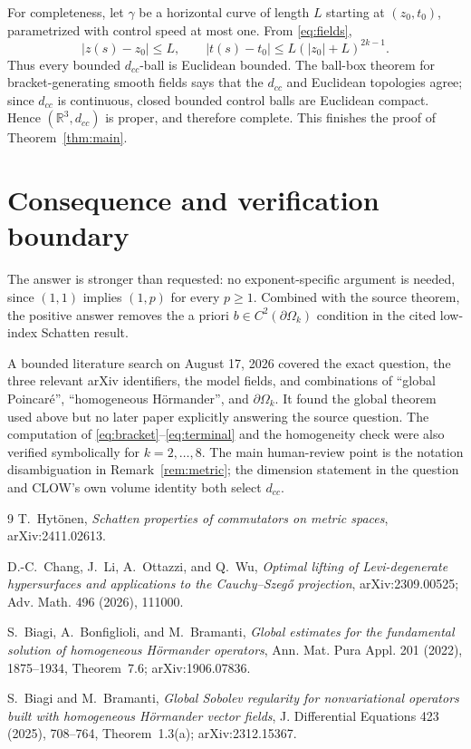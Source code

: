 \documentclass[11pt]{article}
\theoremstyle{remark}
\newcommand{\R}{\mathbb{R}}
\newcommand{\Om}{\partial\Omega_k}
\newcommand{\dcc}{d_{cc}}
\begin{document}
For completeness, let $\gamma$ be a horizontal curve of length $L$ starting
at $(z_0,t_0)$, parametrized with control speed at most one.  From
\eqref{eq:fields},
\[
 |z(s)-z_0|\le L,
 \qquad
 |t(s)-t_0|\le L(|z_0|+L)^{2k-1}.
\]
Thus every bounded $\dcc$-ball is Euclidean bounded.  The ball-box theorem
for bracket-generating smooth fields says that the $\dcc$ and Euclidean
topologies agree; since $\dcc$ is continuous, closed bounded control balls
are Euclidean compact.  Hence $(\R^3,\dcc)$ is proper, and therefore
complete.  This finishes the proof of Theorem~\ref{thm:main}.

\section{Consequence and verification boundary}

The answer is stronger than requested: no exponent-specific argument is
needed, since $(1,1)$ implies $(1,p)$ for every $p\ge1$.  Combined with the
source theorem, the positive answer removes the a priori
$b\in C^2(\Om)$ condition in the cited low-index Schatten result.

A bounded literature search on August 17, 2026 covered the exact question,
the three relevant arXiv identifiers, the model fields, and combinations of
``global Poincar\'e'', ``homogeneous H\"ormander'', and
$\partial\Omega_k$.  It found the global theorem used above but no later
paper explicitly answering the source question.  The computation of
\eqref{eq:bracket}--\eqref{eq:terminal} and the homogeneity check were also
verified symbolically for $k=2,\ldots,8$.  The main human-review point is the
notation disambiguation in Remark~\ref{rem:metric}; the dimension statement
in the question and CLOW's own volume identity both select $\dcc$.

\begin{thebibliography}{9}
T.~Hyt\"onen,
\emph{Schatten properties of commutators on metric spaces},
arXiv:2411.02613.

D.-C.~Chang, J.~Li, A.~Ottazzi, and Q.~Wu,
\emph{Optimal lifting of Levi-degenerate hypersurfaces and applications to
the Cauchy--Szeg\H{o} projection}, arXiv:2309.00525; Adv. Math. 496 (2026),
111000.

S.~Biagi, A.~Bonfiglioli, and M.~Bramanti,
\emph{Global estimates for the fundamental solution of homogeneous
H\"ormander operators}, Ann. Mat. Pura Appl. 201 (2022), 1875--1934,
Theorem~7.6; arXiv:1906.07836.

S.~Biagi and M.~Bramanti,
\emph{Global Sobolev regularity for nonvariational operators built with
homogeneous H\"ormander vector fields}, J. Differential Equations 423
(2025), 708--764, Theorem~1.3(a); arXiv:2312.15367.
\end{thebibliography}
\end{document}
